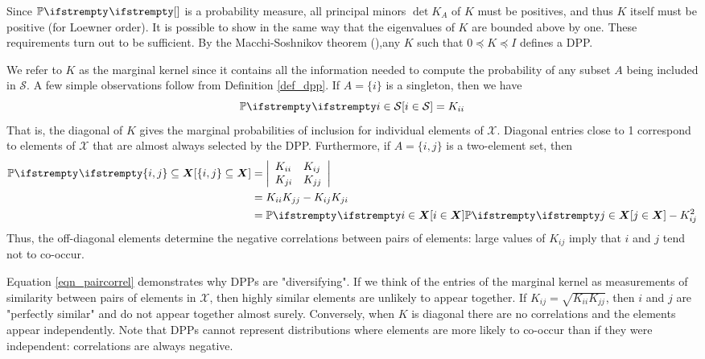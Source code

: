 Since $\PP{}{}$ is a probability measure, all principal minors $\operatorname{det}K_A$ of $K$ must be positives, and thus $K$ itself must be positive (for Loewner order). It is possible to show in the same way that the eigenvalues of $K$ are bounded above by one. These requirements turn out to be sufficient. By the Macchi-Soshnikov theorem (\cite{macchi1975dpp}),any $K$ such that $0 \preceq K \preceq I$ defines a DPP.

We refer to $K$ as the marginal kernel since it contains all the information needed to compute the probability of any subset $A$ being included in $\mathcal{S}$. A few simple observations follow from Definition \ref{def_dpp}. If $A=\{i\}$ is a singleton, then we have
\begin{equation*}
	\PP{}{i \in \mathcal{S}}=K_{i i}
\end{equation*}
That is, the diagonal of $K$ gives the marginal probabilities of inclusion for individual elements of $\mathcal{X}$. Diagonal entries close to 1 correspond to elements of $\mathcal{X}$ that are almost always selected by the DPP. Furthermore, if $A=\{i, j\}$ is a two-element set, then
\begin{equation}
    \label{eqn_paircorrel}
	\begin{aligned}
        \PP{}{\{i, j\} \subseteq \boldsymbol{X}} &=\left|\begin{array}{ll}
	K_{i i} & K_{i j} \\
	K_{j i} & K_{j j}
	\end{array}\right| \\
	&=K_{i i} K_{j j}-K_{i j} K_{j i} \\
	&=\PP{}{i \in \boldsymbol{X}} \PP{}{j \in \boldsymbol{X}}-K_{i j}^2
	\end{aligned}
\end{equation}
Thus, the off-diagonal elements determine the negative correlations between pairs of elements: large values of $K_{i j}$ imply that $i$ and $j$ tend not to co-occur.

Equation \ref{eqn_paircorrel} demonstrates why DPPs are "diversifying". If we think of the entries of the marginal kernel as measurements of similarity between pairs of elements in $\mathcal{X}$, then highly similar elements are unlikely to appear together. If $K_{i j}=\sqrt{K_{i i} K_{j j}}$, then $i$ and $j$ are "perfectly similar" and do not appear together almost surely. Conversely, when $K$ is diagonal there are no correlations and the elements appear independently. Note that DPPs cannot represent distributions where elements are more likely to co-occur than if they were independent: correlations are always negative.


